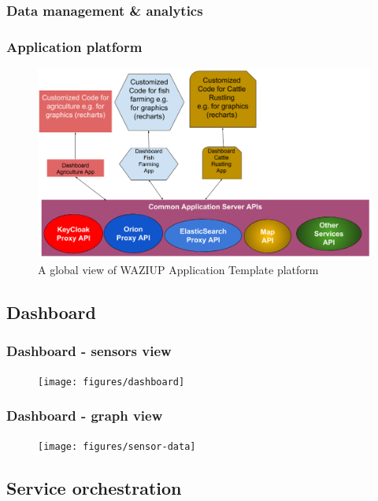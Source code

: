 \documentclass{beamer}
\begin{document}
\begin{frame}
\frametitle{Data management \& analytics}

    
\end{frame}

\begin{frame}
\frametitle{Application platform}

  \begin{figure}[H]  
  \centering  
  \includegraphics[width=.68\linewidth]{figures/AppArchitecture.png}   
  \caption{A global view of WAZIUP Application Template platform}
  \label{fig-app}
  \end{figure}
 
\end{frame}

\subsection{Dashboard}

\begin{frame}
\frametitle{Dashboard - sensors view}

  \begin{figure}[H]  
  \centering  
  \texttt{[image: figures/dashboard]} 
  \label{fig-dashboard}
  \end{figure}

\end{frame}
  
\begin{frame}
\frametitle{Dashboard - graph view}

\vspace{-1cm}
  \begin{figure} 
  \centering  
  \texttt{[image: figures/sensor-data]}
  \label{fig-sensor-data}
  \end{figure}
 
\end{frame}

\subsection{Service orchestration}
\end{document}
